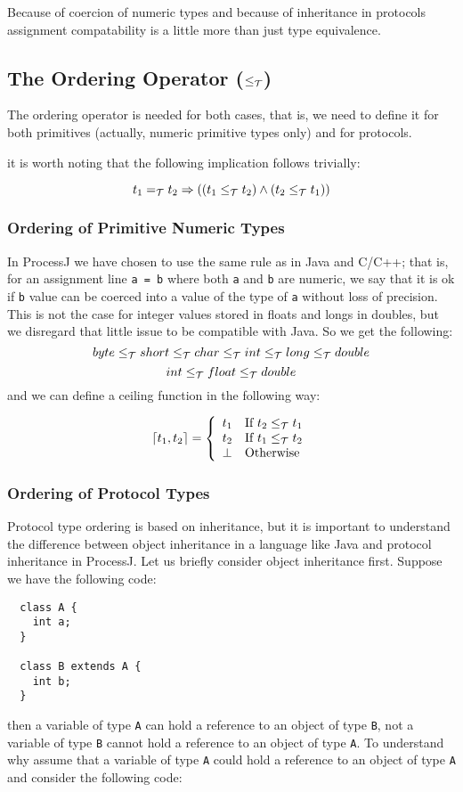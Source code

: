 \documentclass[pdflatex,11pt,letter]{article}
\newcommand{\te}{=_{\cal T}}
\newcommand{\tlt}{\leq_{\cal T}}
\begin{document}
Because of coercion of numeric types and because of inheritance in protocols assignment compatability is a little more than just type equivalence.

\subsection{The Ordering Operator ($\tlt$)}

The ordering operator is needed for both cases, that is, we need to define it for both primitives (actually, numeric primitive types only) and for protocols.

it is worth noting that the following implication follows trivially:

\[
t_1 \te t_2 \Rightarrow ((t_1 \tlt t_2) \wedge (t_2 \tlt t_1))
\]

\subsubsection{Ordering of Primitive Numeric Types}

In ProcessJ we have chosen to use the same rule as in Java and C/C++; that is, for an assignment line {\tt a = b} where both {\tt a} and {\tt b} are numeric, we say that it is ok if {\tt b} value can be coerced into a value of the type of {\tt a} without loss of precision. This is not the case for integer values stored in floats and longs in doubles, but we disregard that little issue to be compatible with Java. So we get the following:
\[
byte \tlt short \tlt char \tlt int \tlt long \tlt double
\]
\[
int \tlt float \tlt double
\]
and we can define a ceiling function in the following way:

\[
\lceil t_1, t_2 \rceil = \left\{
\begin{array}{ll}
t_1 & \textrm{If $t_2 \tlt t_1$}\\
t_2 & \textrm{If $t_1 \tlt t_2$}\\
\bot & \textrm{Otherwise}
\end{array}\right.
\]

\subsubsection{Ordering of Protocol Types}

Protocol type ordering is based on inheritance, but it is important to understand the difference between object inheritance in a language like Java and protocol inheritance in ProcessJ. Let us briefly consider object inheritance first. Suppose we have the following code:
\begin{verbatim}
  class A { 
    int a; 
  }

  class B extends A {
    int b;
  }
\end{verbatim}
then a variable of type {\tt A} can hold a reference to an object of type {\tt B}, not a variable of type {\tt B} cannot hold a reference to an object of type {\tt A}. To understand why assume that a variable of type {\tt A} could hold a reference to an object of type {\tt A} and consider the following code:
\end{document}
